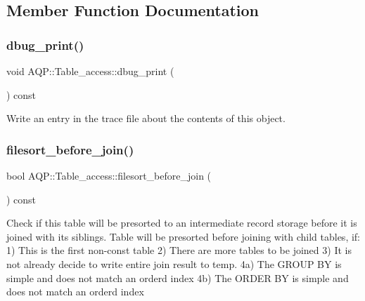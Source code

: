 \subsection{Member Function Documentation}
\mbox{\label{classAQP_1_1Table__access_a994b8967ecebbdcf1340116d590eef6a}} 
\subsubsection{\texorpdfstring{dbug\+\_\+print()}{dbug\_print()}}
{\footnotesize\ttfamily void A\+Q\+P\+::\+Table\+\_\+access\+::dbug\+\_\+print (\begin{DoxyParamCaption}{ }\end{DoxyParamCaption}) const}

Write an entry in the trace file about the contents of this object. \mbox{\label{classAQP_1_1Table__access_a21b7ec7cb60cdf31ea1fe3f8a779fb43}} 
\subsubsection{\texorpdfstring{filesort\+\_\+before\+\_\+join()}{filesort\_before\_join()}}
{\footnotesize\ttfamily bool A\+Q\+P\+::\+Table\+\_\+access\+::filesort\+\_\+before\+\_\+join (\begin{DoxyParamCaption}{ }\end{DoxyParamCaption}) const}

Check if this table will be presorted to an intermediate record storage before it is joined with its siblings. Table will be presorted before joining with child tables, if\+: 1) This is the first non-\/const table 2) There are more tables to be joined 3) It is not already decide to write entire join result to temp. 4a) The G\+R\+O\+UP BY is \textquotesingle{}simple\textquotesingle{} and does not match an orderd index 4b) The O\+R\+D\+ER BY is \textquotesingle{}simple\textquotesingle{} and does not match an orderd index

